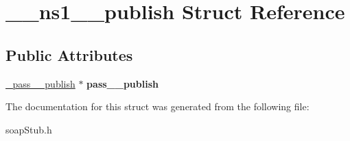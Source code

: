 \hypertarget{struct____ns1____publish}{
\section{\_\-\_\-ns1\_\-\_\-publish Struct Reference}
\label{struct____ns1____publish}
}
\subsection*{Public Attributes}
\begin{DoxyCompactItemize}
\item 
\hypertarget{struct____ns1____publish_aec1270effb71963e6c6336e7ed64f036}{
\hyperlink{class__pass____publish}{\_\-pass\_\-\_\-publish} $\ast$ {\bfseries pass\_\-\_\-publish}}
\label{struct____ns1____publish_aec1270effb71963e6c6336e7ed64f036}

\end{DoxyCompactItemize}


The documentation for this struct was generated from the following file:\begin{DoxyCompactItemize}
\item 
soapStub.h\end{DoxyCompactItemize}
